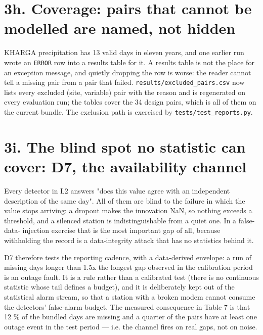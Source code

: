\documentclass[10pt,a4paper]{article}
\begin{document}
\section*{3h. Coverage: pairs that cannot be modelled are named, not hidden}
KHARGA precipitation has 13 valid days in eleven years, and one earlier run wrote an \texttt{ERROR} row into a results table for it. A results table is not the place for an exception message, and quietly dropping the row is worse: the reader cannot tell a missing pair from a pair that failed. \texttt{results/\allowbreak{}excluded\_\allowbreak{}pairs.csv} now lists every excluded (site, variable) pair with the reason and is regenerated on every evaluation run; the tables cover the 34 design pairs, which is all of them on the current bundle. The exclusion path is exercised by \texttt{tests/\allowbreak{}test\_\allowbreak{}reports.py}.

\section*{3i. The blind spot no statistic can cover: D7, the availability channel}
Every detector in L2 answers "does this value agree with an independent description of the same day".  All of them are blind to the failure in which the value stops arriving: a dropout makes the innovation NaN, so nothing exceeds a threshold, and a silenced station is indistinguishable from a quiet one.  In a false-\allowbreak{}data-\allowbreak{} injection exercise that is the most important gap of all, because withholding the record is a data-\allowbreak{}integrity attack that has no statistics behind it.

D7 therefore tests the reporting cadence, with a data-\allowbreak{}derived envelope: a run of missing days longer than 1.5x the longest gap observed in the calibration period is an outage fault.  It is a rule rather than a calibrated test (there is no continuous statistic whose tail defines a budget), and it is deliberately kept out of the statistical alarm stream, so that a station with a broken modem cannot consume the detectors' false-\allowbreak{}alarm budget.  The measured consequence in Table 7 is that 12 \% of the bundled days are missing and a quarter of the pairs have at least one outage event in the test period — i.e. the channel fires on real gaps, not on noise.
\end{document}

